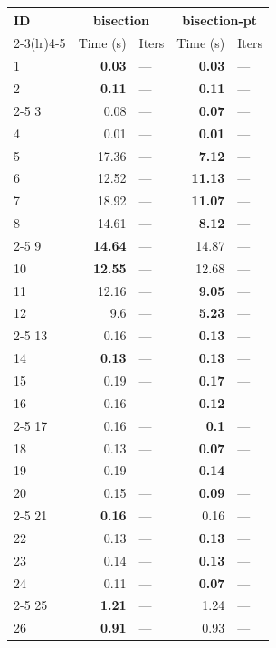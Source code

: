 \begin{longtable}{lr@{\hskip 4pt}l@{\hskip 12pt}r@{\hskip 4pt}l@{\hskip 12pt}}
\toprule
ID & \multicolumn{2}{c}{bisection} & \multicolumn{2}{c}{bisection-pt} \\
\cmidrule(lr){2-3}\cmidrule(lr){4-5}
 & Time (s) &  Iters & Time (s) &  Iters \\
\midrule
\endhead
1 & \textbf{0.03} & --- & \textbf{0.03} & --- \\
2 & \textbf{0.11} & --- & \textbf{0.11} & --- \\
\cmidrule{2-5}
3 & 0.08 & --- & \textbf{0.07} & --- \\
4 & 0.01 & --- & \textbf{0.01} & --- \\
\midrule
5 & 17.36 & --- & \textbf{7.12} & --- \\
6 & 12.52 & --- & \textbf{11.13} & --- \\
7 & 18.92 & --- & \textbf{11.07} & --- \\
8 & 14.61 & --- & \textbf{8.12} & --- \\
\cmidrule{2-5}
9 & \textbf{14.64} & --- & 14.87 & --- \\
10 & \textbf{12.55} & --- & 12.68 & --- \\
11 & 12.16 & --- & \textbf{9.05} & --- \\
12 & 9.6 & --- & \textbf{5.23} & --- \\
\cmidrule{2-5}
13 & 0.16 & --- & \textbf{0.13} & --- \\
14 & \textbf{0.13} & --- & \textbf{0.13} & --- \\
15 & 0.19 & --- & \textbf{0.17} & --- \\
16 & 0.16 & --- & \textbf{0.12} & --- \\
\cmidrule{2-5}
17 & 0.16 & --- & \textbf{0.1} & --- \\
18 & 0.13 & --- & \textbf{0.07} & --- \\
19 & 0.19 & --- & \textbf{0.14} & --- \\
20 & 0.15 & --- & \textbf{0.09} & --- \\
\cmidrule{2-5}
21 & \textbf{0.16} & --- & 0.16 & --- \\
22 & 0.13 & --- & \textbf{0.13} & --- \\
23 & 0.14 & --- & \textbf{0.13} & --- \\
24 & 0.11 & --- & \textbf{0.07} & --- \\
\cmidrule{2-5}
25 & \textbf{1.21} & --- & 1.24 & --- \\
26 & \textbf{0.91} & --- & 0.93 & --- \\

\end{longtable}
